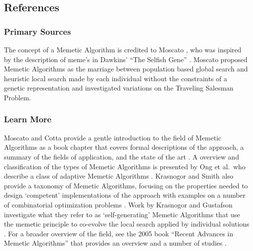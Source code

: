 

\subsection{References}

% 
% 
\subsubsection{Primary Sources}
The concept of a Memetic Algorithm is credited to Moscato \cite{Moscato1989}, who was inspired by the description of meme's in Dawkins' ``The Selfish Gene'' \cite{Dawkins1976}. Moscato proposed Memetic Algorithms as the marriage between population based global search and heuristic local search made by each individual without the constraints of a genetic representation and investigated variations on the Traveling Salesman Problem.

% 
% 
\subsubsection{Learn More}
Moscato and Cotta provide a gentle introduction to the field of Memetic Algorithms as a book chapter that covers formal descriptions of the approach, a summary of the fields of application, and the state of the art \cite{Moscato2003}.
A overview and classification of the types of Memetic Algorithms is presented by Ong et al.\ who describe a class of adaptive Memetic Algorithms \cite{Ong2006}. Krasnogor and Smith also provide a taxonomy of Memetic Algorithms, focusing on the properties needed to design `competent' implementations of the approach with examples on a number of combinatorial optimization problems \cite{Krasnogor2005}. Work by Krasnogor and Gustafson investigate what they refer to as `self-generating' Memetic Algorithms that use the memetic principle to co-evolve the local search applied by individual solutions \cite{Krasnogor2004}. 
For a broader overview of the field, see the 2005 book ``Recent Advances in Memetic Algorithms'' that provides an overview and a number of studies \cite{Hart2005}.


